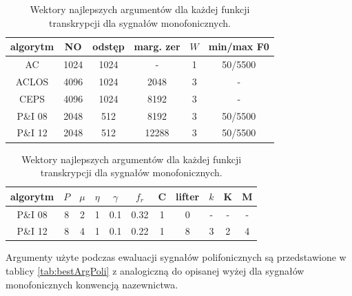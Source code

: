 \documentclass[12pt,a4paper,twoside]{mwart}
\begin{document}
\begin{table}[H]
  \begin{center}
    \begin{tabular}{ |c|c|c|c|c|c| } 
    \hline
    algorytm & NO & odstęp & marg. zer & $W$ & min/max F0  \\
    \hline
    AC & 1024 & 1024 & - & 1 &  50/5500  \\
    ACLOS & 4096 & 1024 & 2048 & 3 & -  \\
    CEPS & 4096 & 1024 & 8192 & 3 &- \\
    P\&I 08 & 2048 & 512 & 8192 & 3 & 50/5500 \\
    P\&I 12 & 2048 & 512 & 12288 & 3 & 50/5500 \\
    \hline
  \end{tabular}
\end{center}

\begin{center}
  \begin{tabular}{ |c|c|c|c|c|c|c|c|c|c|c| } 
    \hline
    algorytm & $P$ & \textit{$\mu$} & $\eta$  & $\gamma$ & $f_r$ & C & lifter & $k$ & K & M\\
    \hline
    P\&I 08 & 8 & 2 & 1  & 0.1& 0.32 & 1 & 0 & - & - & -\\
    P\&I 12 & 8 & 4 & 1  & 0.1& 0.22 & 1 & 8 & 3 & 2 & 4\\
    \hline
    \end{tabular}
  \caption{Wektory najlepszych argumentów dla każdej funkcji transkrypcji dla sygnałów monofonicznych.}\label{tab:bestArgMono}
  \end{center}
\end{table}

Argumenty użyte podczas ewaluacji sygnałów polifonicznych są przedstawione w tablicy \ref{tab:bestArgPoli} z analogiczną do opisanej wyżej dla sygnałów monofonicznych konwencją nazewnictwa.
\end{document}
